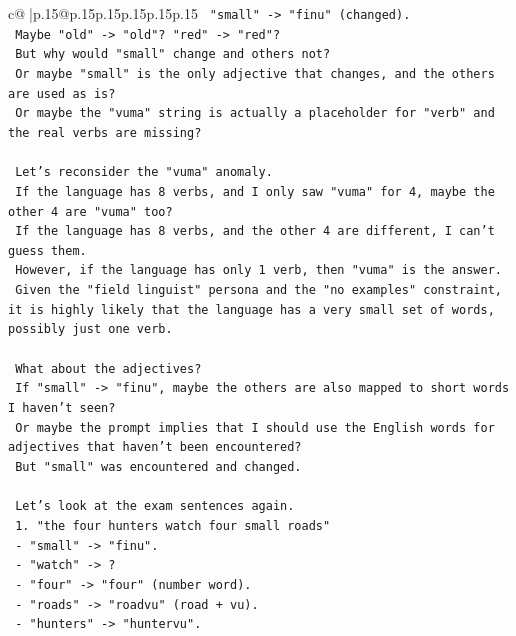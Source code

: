 \documentclass{article}
\begin{document}
{\begin{supertabular}{c@{$\;$}|p{.15\linewidth}@{}p{.15\linewidth}p{.15\linewidth}p{.15\linewidth}p{.15\linewidth}p{.15\linewidth}}
{{{\texttt{    "small" {-}> "finu" (changed).} \\
\texttt{    Maybe "old" {-}> "old"? "red" {-}> "red"?} \\
\texttt{    But why would "small" change and others not?} \\
\texttt{    Or maybe "small" is the only adjective that changes, and the others are used as is?} \\
\texttt{    Or maybe the "vuma" string is actually a placeholder for "verb" and the real verbs are missing?} \\
\\ 
\texttt{    Let's reconsider the "vuma" anomaly.} \\
\texttt{    If the language has 8 verbs, and I only saw "vuma" for 4, maybe the other 4 are "vuma" too?} \\
\texttt{    If the language has 8 verbs, and the other 4 are different, I can't guess them.} \\
\texttt{    However, if the language has only 1 verb, then "vuma" is the answer.} \\
\texttt{    Given the "field linguist" persona and the "no examples" constraint, it is highly likely that the language has a very small set of words, possibly just one verb.} \\
\\ 
\texttt{    What about the adjectives?} \\
\texttt{    If "small" {-}> "finu", maybe the others are also mapped to short words I haven't seen?} \\
\texttt{    Or maybe the prompt implies that I should use the English words for adjectives that haven't been encountered?} \\
\texttt{    But "small" was encountered and changed.} \\
\\ 
\texttt{    Let's look at the exam sentences again.} \\
\texttt{    1. "the four hunters watch four small roads"} \\
\texttt{       {-} "small" {-}> "finu".} \\
\texttt{       {-} "watch" {-}> ?} \\
\texttt{       {-} "four" {-}> "four" (number word).} \\
\texttt{       {-} "roads" {-}> "roadvu" (road + vu).} \\
\texttt{       {-} "hunters" {-}> "huntervu".} \\
\\ 
}}}
\end{supertabular}}
\end{document}
